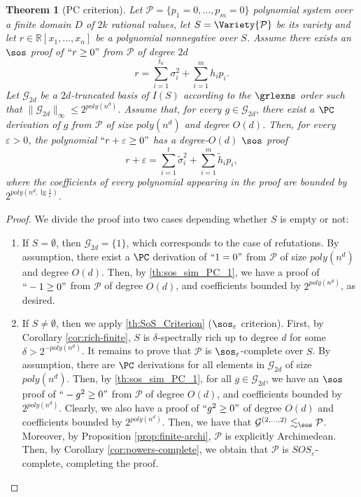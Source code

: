\documentclass[11pt]{article}
\newtheorem{theorem}{Theorem}[section]
\begin{document}
\begin{theorem}[PC criterion]\label{th:PC_criterion}
    Let $\mathcal{P} = \{p_1 = 0, \dots, p_m = 0\}$ polynomial system over a finite domain $D$ of $2k$ rational values, let $S=\Variety{\mathcal{P}}$ be its variety and let $r\in\mathbb{R}[x_1, \dots, x_n]$ be a polynomial nonnegative over $S$. Assume there exists an $\sos$ proof of $``r\geq 0"$ from $\mathcal{P}$ of degree $2d$
  \begin{equation*}
        r = \sum_{i=1}^{t_0} \sigma_i^2 + \sum_{i=1}^m h_i p_i.
    \end{equation*}
   Let $\mathcal{G}_{2d}$ be a $2d$-truncated \GB basis of $I(S)$ according to the $\grlexns$ order such that $\|\mathcal{G}_{2d}\|_{\infty}\leq 2^{poly(n^d)}$. Assume that, for every $g\in \mathcal{G}_{2d}$, there exist a $\PC$ derivation of $g$ from $\mathcal{P}$ of size $poly(n^d)$ and degree $O(d)$. Then, for every $\varepsilon>0$, the polynomial $``r+\varepsilon \geq 0"$ has a degree-$O(d)$ $\sos$ proof
    \begin{equation*}
        r +\varepsilon = \sum_{i=1}^{t} \tilde{\sigma}_i^2 + \sum_{i=1}^m \tilde{h}_i p_i,
    \end{equation*}
    where the coefficients of every polynomial appearing in the proof are bounded by $2^{poly(n^d, \lg \frac{1}{\varepsilon})}$.   
\end{theorem}
\begin{proof}
    We divide the proof into two cases depending whether $S$ is empty or not: 
    \begin{enumerate}
        \item If $S = \emptyset$, then $\mathcal{G}_{2d} = \{ 1 \}$, which corresponds to the case of refutations. By assumption, there exist a $\PC$ derivation of $``1=0"$ from $\mathcal{P}$ of size $poly(n^d)$ and degree $O(d)$. Then, by \cref{th:sos_sim_PC_1}, we have a proof of $``-1\geq 0"$ from $\mathcal{P}$ of degree $O(d)$, and coefficients bounded by $2^{poly(n^d)}$, as desired.
        \item If $S\neq \emptyset$, then we apply \cref{th:SoS_Criterion} ($\sos_\varepsilon$ criterion). First, by Corollary \ref{cor:rich-finite}, $S$ is $\delta$-spectrally rich up to degree $d$ for some $\delta>2^{-poly(n^d)}$. It remains to prove that $\mathcal{P}$ is $\sos_{\varepsilon}$-complete over $S$. By assumption, there are $\PC$ derivations for all elements in $\mathcal G_{2d}$ of size $poly(n^d)$. Then, by \cref{th:sos_sim_PC_1}, for all $g\in \mathcal{G}_{2d}$, we have an $\sos$ proof of $``-g^2\geq 0"$ from $\mathcal{P}$ of degree $O(d)$, and coefficients bounded by $2^{poly(n^d)}$. Clearly, we also have a proof of $``g^2\geq 0"$ of degree $O(d)$ and coefficients bounded by $2^{poly(n^d)}$. Then, we have that $\mathcal{G}^{(2, \dots, 2)}\lesssim_{\sos} \mathcal{P}$. Moreover, by Proposition \ref{prop:finite-archi}, $\mathcal{P}$ is explicitly Archimedean. Then, by Corollary \ref{cor:powers-complete}, we obtain that $\mathcal{P}$ is $SOS_{\varepsilon}$-complete, completing the proof.
        \end{enumerate}
\end{proof}
\end{document}
